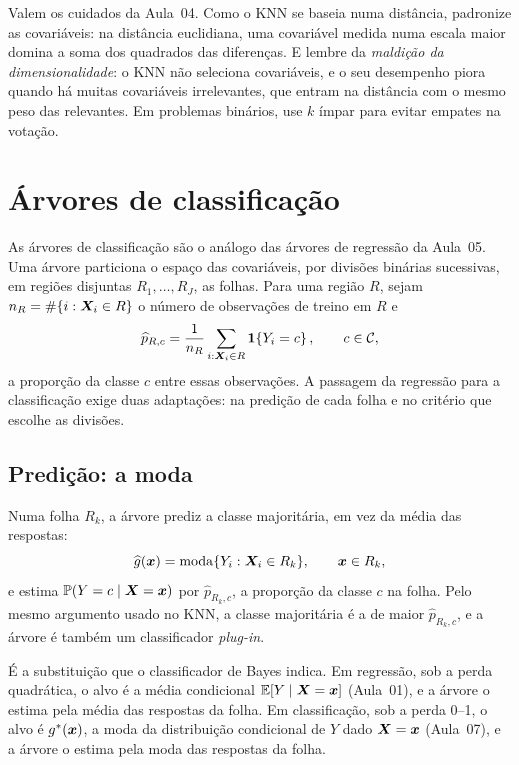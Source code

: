 \documentclass[11pt,a4paper]{article}
\begin{document}
\begin{atencao}
Valem os cuidados da Aula~04. Como o KNN se baseia numa distância, padronize as
covariáveis: na distância euclidiana, uma covariável medida numa escala maior domina
a soma dos quadrados das diferenças. E lembre da \emph{maldição da dimensionalidade}:
o KNN não seleciona covariáveis, e o seu desempenho piora quando há muitas
covariáveis irrelevantes, que entram na distância com o mesmo peso das relevantes. Em
problemas binários, use $k$ ímpar para evitar empates na votação.
\end{atencao}

\FloatBarrier

\section{Árvores de classificação}
As árvores de classificação são o análogo das árvores de regressão da Aula~05. Uma
árvore particiona o espaço das covariáveis, por divisões binárias sucessivas, em
regiões disjuntas $R_1,\dots,R_J$, as folhas. Para uma região $R$, sejam
$n_R=\#\{i:\bm{X}_i\in R\}$ o número de observações de treino em $R$ e
\[
  \widehat p_{R,c}=\frac{1}{n_R}\sum_{i:\bm{X}_i\in R}\mathbf{1}\!\left\{Y_i=c\right\},\qquad c\in\mathcal{C},
\]
a proporção da classe $c$ entre essas observações. A passagem da regressão para a
classificação exige duas adaptações: na predição de cada folha e no critério que
escolhe as divisões.

\subsection{Predição: a moda}
Numa folha $R_k$, a árvore prediz a classe majoritária, em vez da média das respostas:
\begin{equation}\label{eq:arvcls}
  \widehat{g}(\bm{x}) = \operatorname{moda}\{Y_i : \bm{X}_i\in R_k\},\qquad \bm{x}\in R_k,
\end{equation}
e estima $\mathbb{P}(Y=c\mid\bm{X}=\bm{x})$ por $\widehat p_{R_k,c}$, a proporção da classe $c$ na
folha. Pelo mesmo argumento usado no KNN, a classe majoritária é a de maior
$\widehat p_{R_k,c}$, e a árvore é também um classificador \emph{plug-in}.

É a substituição que o classificador de Bayes indica. Em regressão, sob a perda
quadrática, o alvo é a média condicional $\mathbb{E}[Y\mid\bm{X}=\bm{x}]$ (Aula~01), e a árvore o
estima pela média das respostas da folha. Em classificação, sob a perda 0--1, o alvo é
$g^*(\bm{x})$, a moda da distribuição condicional de $Y$ dado $\bm{X}=\bm{x}$ (Aula~07), e a
árvore o estima pela moda das respostas da folha.
\end{document}
